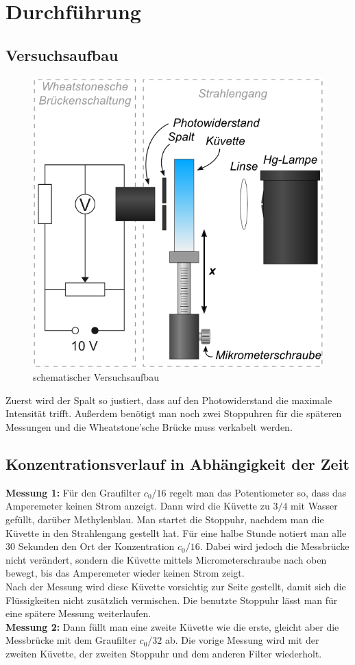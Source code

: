 \documentclass[12pt,a4paper,titlepage,headinclude,bibtotoc]{scrartcl}
\begin{document}
\section{Durchführung}
\label{sec:durchfuehrung}
\subsection{Versuchsaufbau}
\begin{figure}[!htb]
	\centering	
	\includegraphics[scale=0.7]{Aufbau_schematisch.png}
	\caption{schematischer Versuchsaufbau \cite{lp}}
\end{figure}
Zuerst wird der Spalt so justiert, dass auf den Photowiderstand die maximale Intensität trifft.
Außerdem benötigt man noch zwei Stoppuhren für die späteren Messungen und die Wheatstone'sche Brücke muss verkabelt werden.

\subsection{Konzentrationsverlauf in Abhängigkeit der Zeit}
\textbf{Messung 1:}
Für den Graufilter $c_0/16$ regelt man das Potentiometer so, dass das Amperemeter keinen Strom anzeigt.
Dann wird die Küvette zu $3/4$ mit Wasser gefüllt, darüber Methylenblau.
Man startet die Stoppuhr, nachdem man die Küvette in den Strahlengang gestellt hat.
Für eine halbe Stunde notiert man alle 30 Sekunden den Ort der Konzentration $c_0/16$.
Dabei wird jedoch die Messbrücke nicht verändert, sondern die Küvette mittels Micrometerschraube nach oben bewegt, bis das Amperemeter wieder keinen Strom zeigt.\\
Nach der Messung wird diese Küvette vorsichtig zur Seite gestellt, damit sich die Flüssigkeiten nicht zusätzlich vermischen.
Die benutzte Stoppuhr lässt man für eine spätere Messung weiterlaufen.\\
\textbf{Messung 2:}
Dann füllt man eine zweite Küvette wie die erste, gleicht aber die Messbrücke mit dem Graufilter $c_0/32$ ab.
Die vorige Messung wird mit der zweiten Küvette, der zweiten Stoppuhr und dem anderen Filter wiederholt.
\end{document}
